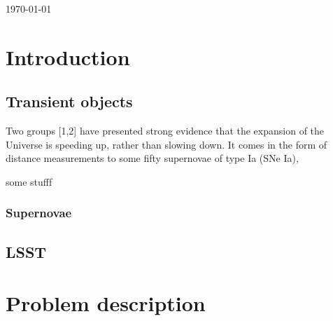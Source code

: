 \begin{titlepage}


{\large \today}\\[2cm] %


\tableofcontents
 

\vfill %

\end{titlepage}


\section{Introduction}



\subsection{Transient objects}


Two groups [1,2] have presented strong evidence that the expansion of the Universe is speeding up, rather than
slowing down. It comes in the form of distance measurements to some fifty supernovae of type Ia (SNe Ia),


some stufff \cite{SN_darkEnergy}
\subsubsection{Supernovae}
\subsection{LSST}
\section{Problem description}
